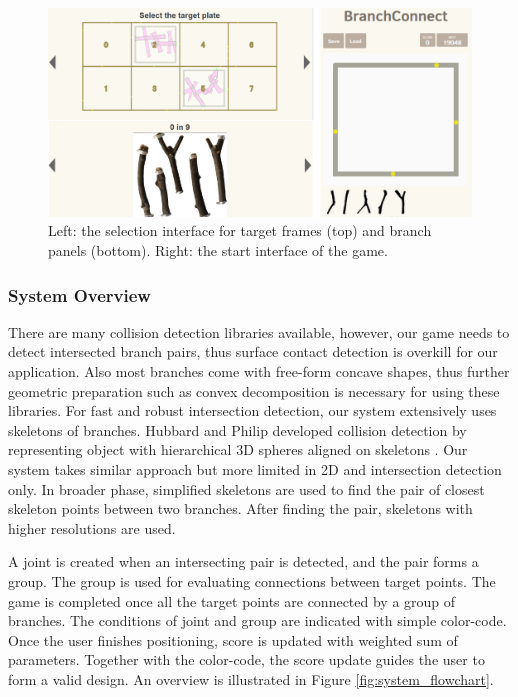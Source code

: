 \begin{figure}[H]
  \begin{center}
    \includegraphics[width = 0.4\paperwidth]{images/interface/game_interface.png}
    \caption{Left: the selection interface for target frames (top) and branch panels (bottom). Right: the start interface of the game.}
    \label{fig:game_interface}
  \end{center}
\end{figure}
%
\subsubsection*{System Overview}
There are many collision detection libraries available, however, our game needs to detect intersected branch pairs, thus surface contact detection is overkill for our application.
Also most branches come with free-form concave shapes, thus further geometric preparation such as convex decomposition is necessary for using these libraries.
For fast and robust intersection detection, our system extensively uses skeletons of branches.
Hubbard and Philip developed collision detection by representing object with hierarchical 3D spheres aligned on skeletons \cite{Hubbard:1996:APS:231731.231732}.
Our system takes similar approach but more limited in 2D and intersection detection only.
In broader phase, simplified skeletons are used to find the pair of closest skeleton points between two branches.
After finding the pair, skeletons with higher resolutions are used.

A joint is created when an intersecting pair is detected, and the pair forms a group.
The group is used for evaluating connections between target points.
The game is completed once all the target points are connected by a group of branches.
The conditions of joint and group are indicated with simple color-code.
Once the user finishes positioning, score is updated with weighted sum of parameters.
Together with the color-code, the score update guides the user to form a valid design.
An overview is illustrated in Figure \ref{fig:system_flowchart}.

